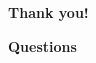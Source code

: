 \documentclass[10pt,aspectratio=169]{beamer}
\begin{document}
\begin{frame}[plain]
  \vfill
  \centering
  {\Huge \textbf{Thank you!}}\\[1.5em]
  
\end{frame}

\appendix

\begin{frame}[plain]
  \centering
  \vfill
  {\LARGE \textbf{Questions}}\\[1em]
  
  \vfill
\end{frame}
\end{document}
